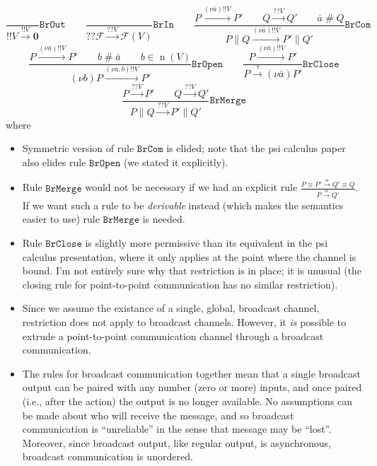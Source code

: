 \documentclass{article}
\newcommand{\bOut}{{!\!!}}
\newcommand{\bIn}{{?\!?}}
\newcommand{\new}[2]{(\nu\!#1) #2}
\newcommand{\freshFor}{\mathrel{\#}}
\newcommand{\nil}{\mathbf{0}}
\DeclareMathOperator{\n}{n}
\begin{document}
\begin{itemize}
\begin{equation*}
%
%
\frac{
}{
\bOut V \xrightarrow{\bOut V} \nil
}
\mathtt{BrOut}
%
\qquad
%
%
\frac{
}{
\bIn \mathcal{F} \xrightarrow{\bIn V} \mathcal{F}(V)
}
\mathtt{BrIn}
%
\qquad
%
%
\frac{
P \xrightarrow{\new{\bar{a}}{\bOut V}} P' \qquad
Q \xrightarrow{\bIn V} Q' \qquad
\bar{a} \freshFor Q
}{
P \parallel Q \xrightarrow{\new{\bar{a}}{\bOut V}} P' \parallel Q'
}
\mathtt{BrCom}
\end{equation*}
%
\begin{equation*}
%
%
\frac{
P \xrightarrow{\new{\bar{a}}{\bOut V}} P' \qquad
b \freshFor \bar{a} \qquad
b \in \n(V)
}{
\new{b}{P} \xrightarrow{\new{\bar{a},b}{\bOut V}} P'
}
\mathtt{BrOpen}
%
\qquad
%
%
\frac{
P \xrightarrow{\new{\bar{a}}{\bOut V}} P'
}{
P \xrightarrow{\tau} \new{\bar{a}}{P'}
}
\mathtt{BrClose}
\end{equation*}
%
\begin{equation*}
%
%
\frac{
P \xrightarrow{\bIn V} P' \qquad
Q \xrightarrow{\bIn V} Q'
}{
P \parallel Q \xrightarrow{\bIn V} P' \parallel Q'
}
\mathtt{BrMerge}
\end{equation*}
%
where
%
\begin{itemize}
\item Symmetric version of rule $\mathtt{BrCom}$ is elided; note that the psi
calculus paper also elides rule $\mathtt{BrOpen}$ (we stated it explicitly).
\item Rule $\mathtt{BrMerge}$ would not be necessary if we had an explicit rule
\begin{math}
\displaystyle
\frac{
P \equiv P' \xrightarrow{\alpha} Q' \equiv Q
}{
P \xrightarrow{\alpha} Q'
}
\end{math}.
If we want such a rule to be \emph{derivable} instead (which makes the semantics
easier to use) rule $\mathtt{BrMerge}$ is needed.
\item Rule $\mathtt{BrClose}$ is slightly more permissive than its equivalent in
the psi calculus presentation, where it only applies at the point where the
channel is bound. I'm not entirely sure why that restriction is in place; it
is unusual (the closing rule for point-to-point communication has no similar
restriction).
\item Since we assume the existance of a single, global, broadcast channel,
restriction does not apply to broadcast channels. However, it \emph{is} possible
to extrude a point-to-point communication channel through a broadcast communication.
\item The rules for broadcast communication together mean that a single
broadcast output can be paired with any number (zero or more) inputs, and once
paired  (i.e., after the action) the output is no longer available. No
assumptions can be made about who will receive the message, and so broadcast
communication is ``unreliable'' in the sense that message may be ``lost''.
Moreover, since broadcast output, like regular output, is asynchronous,
broadcast communication is unordered.
\end{itemize}


\end{itemize}
\end{document}

